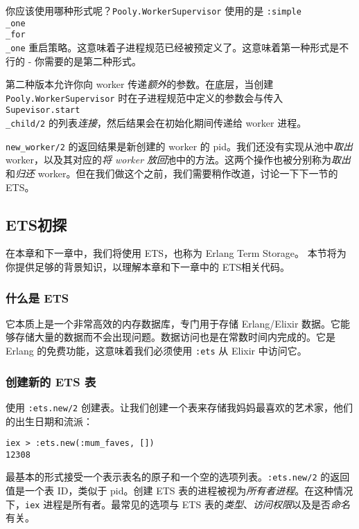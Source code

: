 你应该使用哪种形式呢？\texttt{Pooly.WorkerSupervisor}
使用的是 \texttt{:simple\\\_one\\\_for\\\_one}
重启策略。这意味着子进程规范已经被预定义了。这意味着第一种形式是不行的 -
你需要的是第二种形式。

第二种版本允许你向 worker 传递\emph{额外}的参数。在底层，当创建
\texttt{Pooly.WorkerSupervisor}
时在子进程规范中定义的参数会与传入
\texttt{Supevisor.start\\\_child/2}
的列表\emph{连接}，然后结果会在初始化期间传递给 worker 进程。

\texttt{new\_worker/2} 的返回结果是新创建的 worker 的
pid。我们还没有实现从池中\emph{取出} worker，以及其对应的\emph{将 worker
放回}池中的方法。这两个操作也被分别称为\emph{取出}和\emph{归还}
worker。但在我们做这个之前，我们需要稍作改道，讨论一下下一节的 ETS。


\subsection{ETS初探}

在本章和下一章中，我们将使用 ETS，也称为 Erlang Term Storage。
本节将为你提供足够的背景知识，以理解本章和下一章中的 ETS相关代码。


\subsubsection{什么是 ETS}

它本质上是一个非常高效的内存数据库，专门用于存储 Erlang/Elixir
数据。它能够存储大量的数据而不会出现问题。数据访问也是在常数时间内完成的。它是
Erlang 的免费功能，这意味着我们必须使用 \texttt{:ets}
从 Elixir 中访问它。


\subsubsection{创建新的 ETS 表}

使用 \texttt{:ets.new/2}
创建表。让我们创建一个表来存储我妈妈最喜欢的艺术家，他们的出生日期和流派：

\begin{code}{}
\begin{verbatim}
iex > :ets.new(:mum_faves, [])
12308
\end{verbatim}
\end{code}

最基本的形式接受一个表示表名的原子和一个空的选项列表。\texttt{:ets.new/2}
的返回值是一个表 ID，类似于 pid。创建 ETS
表的进程被视为\emph{所有者进程}。在这种情况下，\texttt{iex}
进程是所有者。最常见的选项与 ETS
表的\emph{类型}、\emph{访问权限}以及是否\emph{命名}有关。


